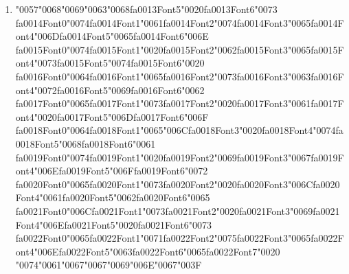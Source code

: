 \documentclass[11pt]{article}
\begin{document}
\begin{enumerate}[label=Q\arabic*., leftmargin=*]
\textbf{A.} Beginning of an entity

\textbf{B.} Inside an entity

\textbf{C.} Outside any entity

\textbf{D.} Between two tokens

\item {\char"0057}{\char"0068}{\char"0069}{\char"0063}{\char"0068}{\csname fa0013Font5\endcsname\char"0020}{\csname fa0013Font6\endcsname\char"0073} {\csname fa0014Font0\endcsname\char"0074}{\csname fa0014Font1\endcsname\char"0061}{\csname fa0014Font2\endcsname\char"0074}{\csname fa0014Font3\endcsname\char"0065}{\csname fa0014Font4\endcsname\char"006D}{\csname fa0014Font5\endcsname\char"0065}{\csname fa0014Font6\endcsname\char"006E} {\csname fa0015Font0\endcsname\char"0074}{\csname fa0015Font1\endcsname\char"0020}{\csname fa0015Font2\endcsname\char"0062}{\csname fa0015Font3\endcsname\char"0065}{\csname fa0015Font4\endcsname\char"0073}{\csname fa0015Font5\endcsname\char"0074}{\csname fa0015Font6\endcsname\char"0020} {\csname fa0016Font0\endcsname\char"0064}{\csname fa0016Font1\endcsname\char"0065}{\csname fa0016Font2\endcsname\char"0073}{\csname fa0016Font3\endcsname\char"0063}{\csname fa0016Font4\endcsname\char"0072}{\csname fa0016Font5\endcsname\char"0069}{\csname fa0016Font6\endcsname\char"0062} {\csname fa0017Font0\endcsname\char"0065}{\csname fa0017Font1\endcsname\char"0073}{\csname fa0017Font2\endcsname\char"0020}{\csname fa0017Font3\endcsname\char"0061}{\csname fa0017Font4\endcsname\char"0020}{\csname fa0017Font5\endcsname\char"006D}{\csname fa0017Font6\endcsname\char"006F} {\csname fa0018Font0\endcsname\char"0064}{\csname fa0018Font1\endcsname\char"0065}{\char"006C}{\csname fa0018Font3\endcsname\char"0020}{\csname fa0018Font4\endcsname\char"0074}{\csname fa0018Font5\endcsname\char"0068}{\csname fa0018Font6\endcsname\char"0061} {\csname fa0019Font0\endcsname\char"0074}{\csname fa0019Font1\endcsname\char"0020}{\csname fa0019Font2\endcsname\char"0069}{\csname fa0019Font3\endcsname\char"0067}{\csname fa0019Font4\endcsname\char"006E}{\csname fa0019Font5\endcsname\char"006F}{\csname fa0019Font6\endcsname\char"0072} {\csname fa0020Font0\endcsname\char"0065}{\csname fa0020Font1\endcsname\char"0073}{\csname fa0020Font2\endcsname\char"0020}{\csname fa0020Font3\endcsname\char"006C}{\csname fa0020Font4\endcsname\char"0061}{\csname fa0020Font5\endcsname\char"0062}{\csname fa0020Font6\endcsname\char"0065} {\csname fa0021Font0\endcsname\char"006C}{\csname fa0021Font1\endcsname\char"0073}{\csname fa0021Font2\endcsname\char"0020}{\csname fa0021Font3\endcsname\char"0069}{\csname fa0021Font4\endcsname\char"006E}{\csname fa0021Font5\endcsname\char"0020}{\csname fa0021Font6\endcsname\char"0073} {\csname fa0022Font0\endcsname\char"0065}{\csname fa0022Font1\endcsname\char"0071}{\csname fa0022Font2\endcsname\char"0075}{\csname fa0022Font3\endcsname\char"0065}{\csname fa0022Font4\endcsname\char"006E}{\csname fa0022Font5\endcsname\char"0063}{\csname fa0022Font6\endcsname\char"0065}{\csname fa0022Font7\endcsname\char"0020} {\char"0074}{\char"0061}{\char"0067}{\char"0067}{\char"0069}{\char"006E}{\char"0067}{\char"003F}


\end{enumerate}
\end{document}
